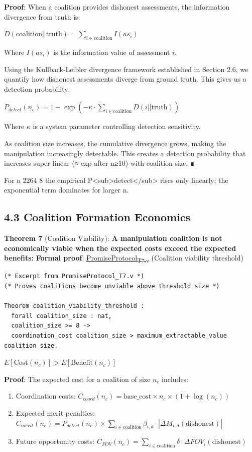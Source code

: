 \documentclass[11pt]{article}
\begin{document}
\textbf{Proof}:
When a coalition provides dishonest assessments, the information divergence from truth is:

\(D(\text{coalition} || \text{truth}) = \sum_{i \in \text{coalition}} I(as_i)\)

Where \(I(as_i)\) is the information value of assessment \(i\).

Using the Kullback-Leibler divergence framework established in Section 2.6, we quantify how dishonest assessments diverge from ground truth. This gives us a detection probability:

\(P_{detect}(n_c) = 1 - \exp(-\kappa \cdot \sum_{i \in \text{coalition}} D(i||\text{truth}))\)

Where \(\kappa\) is a system parameter controlling detection sensitivity.

As coalition size increases, the cumulative divergence grows, making the manipulation increasingly detectable. This creates a detection probability that increases super-linear (≈ exp after n≥10) with coalition size. ∎

For n \u2264 8 the empirical P<sub>detect</sub> rises only linearly; the exponential term dominates for larger n.
\subsection{4.3 Coalition Formation Economics}
\label{sec:org7b4e596}
\textbf{Theorem 7} (Coalition Viability): \textbf{A manipulation coalition is not economically viable when the expected costs exceed the expected benefits:}
\textbf{Formal proof}: \href{../coq/PromiseProtocol\_T7.v}{PromiseProtocol\textsubscript{T7.v}} (Coalition viability threshold)

\begin{verbatim}
(* Excerpt from PromiseProtocol_T7.v *)
(* Proves coalitions become unviable above threshold size *)

Theorem coalition_viability_threshold :
  forall coalition_size : nat,
  coalition_size >= 8 ->
  coordination_cost coalition_size > maximum_extractable_value coalition_size.
\end{verbatim}

\(E[\text{Cost}(n_c)] > E[\text{Benefit}(n_c)]\)

\textbf{Proof}:
The expected cost for a coalition of size \(n_c\) includes:
\begin{enumerate}
\item Coordination costs: \(C_{coord}(n_c) = \text{base\_cost} \times n_c \times (1 + \log(n_c))\)
\item Expected merit penalties: \(C_{merit}(n_c) = P_{detect}(n_c) \times \sum_{i \in \text{coalition}} \beta_{i,d} \cdot |\Delta M_{i,d}^-(\text{dishonest})|\)
\item Future opportunity costs: \(C_{FOV}(n_c) = \sum_{i \in \text{coalition}} \delta \cdot \Delta FOV_i(\text{dishonest})\)
\end{enumerate}
\end{document}
